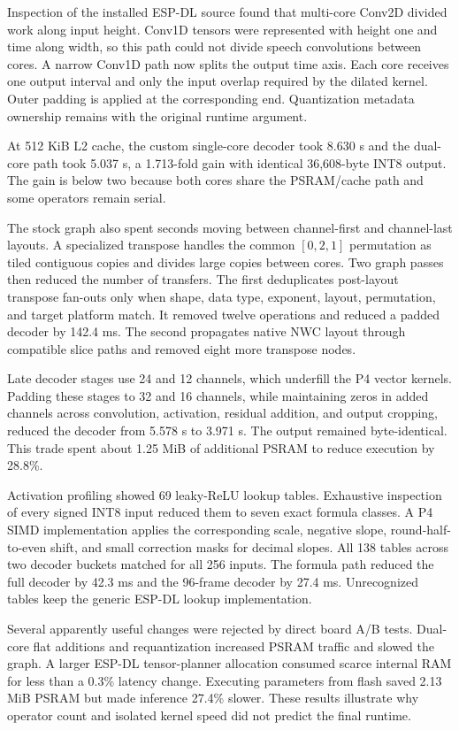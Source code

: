 \documentclass[10pt]{article}
\begin{document}
Inspection of the installed ESP-DL source found that multi-core Conv2D divided
work along input height. Conv1D tensors were represented with height one and
time along width, so this path could not divide speech convolutions between
cores. A narrow Conv1D path now splits the output time axis. Each core receives
one output interval and only the input overlap required by the dilated kernel.
Outer padding is applied at the corresponding end. Quantization metadata
ownership remains with the original runtime argument.

At 512 KiB L2 cache, the custom single-core decoder took 8.630 s and the
dual-core path took 5.037 s, a 1.713-fold gain with identical 36,608-byte INT8
output. The gain is below two because both cores share the PSRAM/cache path and
some operators remain serial.

The stock graph also spent seconds moving between channel-first and
channel-last layouts. A specialized transpose handles the common
$[0,2,1]$ permutation as tiled contiguous copies and divides large copies
between cores. Two graph passes then reduced the number of transfers. The
first deduplicates post-layout transpose fan-outs only when shape, data type,
exponent, layout, permutation, and target platform match. It removed twelve
operations and reduced a padded decoder by 142.4 ms. The second propagates
native NWC layout through compatible slice paths and removed eight more
transpose nodes.

Late decoder stages use 24 and 12 channels, which underfill the P4 vector
kernels. Padding these stages to 32 and 16 channels, while maintaining zeros
in added channels across convolution, activation, residual addition, and
output cropping, reduced the decoder from 5.578 s to 3.971 s. The output
remained byte-identical. This trade spent about 1.25 MiB of additional PSRAM
to reduce execution by 28.8\%.

Activation profiling showed 69 leaky-ReLU lookup tables. Exhaustive inspection
of every signed INT8 input reduced them to seven exact formula classes. A P4
SIMD implementation applies the corresponding scale, negative slope,
round-half-to-even shift, and small correction masks for decimal slopes. All
138 tables across two decoder buckets matched for all 256 inputs. The formula
path reduced the full decoder by 42.3 ms and the 96-frame decoder by 27.4 ms.
Unrecognized tables keep the generic ESP-DL lookup implementation.

Several apparently useful changes were rejected by direct board A/B tests.
Dual-core flat additions and requantization increased PSRAM traffic and slowed
the graph. A larger ESP-DL tensor-planner allocation consumed scarce internal
RAM for less than a 0.3\% latency change. Executing parameters from flash saved
2.13 MiB PSRAM but made inference 27.4\% slower. These results illustrate why
operator count and isolated kernel speed did not predict the final runtime.
\end{document}
